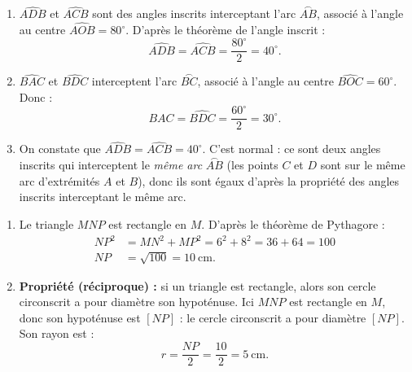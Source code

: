 \documentclass[11pt]{article}
\begin{document}
\begin{corrige}
\begin{enumerate}
\item $\widehat{ADB}$ et $\widehat{ACB}$ sont des angles inscrits interceptant l'arc $\overset{\frown}{AB}$, associé à l'angle au centre $\widehat{AOB} = 80^{\circ}$. D'après le théorème de l'angle inscrit :
\[ \widehat{ADB} = \widehat{ACB} = \frac{80^{\circ}}{2} = 40^{\circ}. \]
\item $\widehat{BAC}$ et $\widehat{BDC}$ interceptent l'arc $\overset{\frown}{BC}$, associé à l'angle au centre $\widehat{BOC} = 60^{\circ}$. Donc :
\[ \widehat{BAC} = \widehat{BDC} = \frac{60^{\circ}}{2} = 30^{\circ}. \]
\item On constate que $\widehat{ADB} = \widehat{ACB} = 40^{\circ}$. C'est normal : ce sont deux angles inscrits qui interceptent le \emph{même arc} $\overset{\frown}{AB}$ (les points $C$ et $D$ sont sur le même arc d'extrémités $A$ et $B$), donc ils sont égaux d'après la propriété des angles inscrits interceptant le même arc.
\end{enumerate}
\end{corrige}

\begin{corrige}
\begin{enumerate}
\item Le triangle $MNP$ est rectangle en $M$. D'après le théorème de Pythagore :
\begin{align*}
NP^{2} &= MN^{2} + MP^{2} = 6^{2} + 8^{2} = 36 + 64 = 100 \\
NP &= \sqrt{100} = 10~\text{cm}.
\end{align*}
\item \textbf{Propriété (réciproque) :} si un triangle est rectangle, alors son cercle circonscrit a pour diamètre son hypoténuse. Ici $MNP$ est rectangle en $M$, donc son hypoténuse est $[NP]$ : le cercle circonscrit a pour diamètre $[NP]$. Son rayon est :
\[ r = \frac{NP}{2} = \frac{10}{2} = 5~\text{cm}. \]
\end{enumerate}
\end{corrige}
\end{document}
